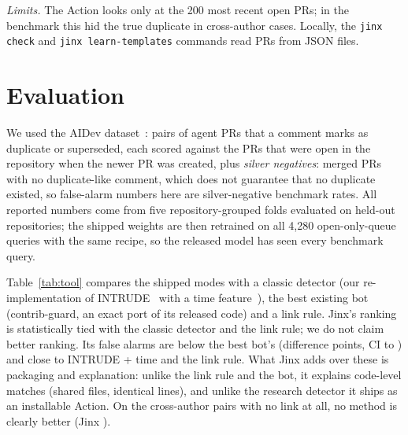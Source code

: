 \documentclass[sigconf]{acmart}
\begin{document}
\emph{Limits.} The Action looks only at the 200 most recent open PRs; in the benchmark this hid the true duplicate in \capCross{} cross-author cases. Locally, the \texttt{jinx check} and \texttt{jinx learn-templates} commands read PRs from JSON files.

\section{Evaluation}
\begin{table}[t]\centering\caption{Cross-author duplicate pairs on open-only queues ($n=\nCross$, historical AIDev data~\cite{jinxstudy}). Flagged: true duplicate ranked first and above the method's threshold. False alarms on \nNeg{} PRs with no known duplicate, 95\% CIs.}\label{tab:tool}
\footnotesize\setlength{\tabcolsep}{3pt}\end{table}

We used the AIDev dataset~\cite{li2026aidev}: \nPairs{} pairs of agent PRs that a comment marks as duplicate or superseded, each scored against the PRs that were open in the repository when the newer PR was created, plus \nNeg{} \emph{silver negatives}: merged PRs with no duplicate-like comment, which does not guarantee that no duplicate existed, so false-alarm numbers here are silver-negative benchmark rates. All reported numbers come from five repository-grouped folds evaluated on held-out repositories; the shipped weights are then retrained on all 4{,}280 open-only-queue queries with the same recipe, so the released model has seen every benchmark query.

Table~\ref{tab:tool} compares the shipped modes with a classic detector (our re-implementation of INTRUDE~\cite{ren2019intrude} with a time feature~\cite{wang2019time}), the best existing bot (contrib-guard, an exact port of its released code) and a link rule. Jinx's ranking is statistically tied with the classic detector and the link rule; we do not claim better ranking. Its false alarms are below the best bot's (difference \dFARcg{} points, CI \dFARcgLo{} to \dFARcgHi) and close to INTRUDE + time and the link rule. What Jinx adds over these is packaging and explanation: unlike the link rule and the bot, it explains code-level matches (shared files, identical lines), and unlike the research detector it ships as an installable Action. On the \nNoLink{} cross-author pairs with no link at all, no method is clearly better (Jinx \ROnejinxNoLink).
\end{document}
